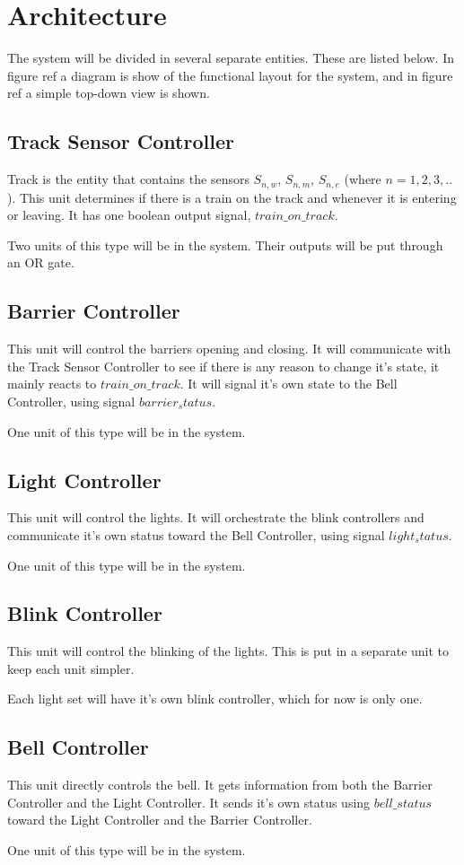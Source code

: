 \documentclass[final]{report}
\begin{document}
\chapter{Architecture}
The system will be divided in several separate entities.
These are listed below.
In figure ref{} a diagram is show of the functional layout for the system, and in figure ref{} a simple top-down view is shown.

\section{Track Sensor Controller}
Track is the entity that contains the sensors $S_{n,w}$, $S_{n,m}$, $S_{n,e}$ (where $n = 1,2,3,..$).
This unit determines if there is a train on the track and whenever it is entering or leaving.
It has one boolean output signal, $train\_on\_track$.

Two units of this type will be in the system.
Their outputs will be put through an OR gate.
\section{Barrier Controller}
This unit will control the barriers opening and closing.
It will communicate with the Track Sensor Controller to see if there is any reason to change it's state, it mainly reacts to $train\_on\_track$.
It will signal it's own state to the Bell Controller, using signal $barrier_status$.

One unit of this type will be in the system.
\section{Light Controller}
This unit will control the lights.
It will orchestrate the blink controllers and communicate it's own status toward the Bell Controller, using signal $light_status$.

One unit of this type will be in the system.
\section{Blink Controller}
This unit will control the blinking of the lights.
This is put in a separate unit to keep each unit simpler.

Each light set will have it's own blink controller, which for now is only one.
\section{Bell Controller}
This unit directly controls the bell.
It gets information from both the Barrier Controller and the Light Controller.
It sends it's own status using $bell\_status$ toward the Light Controller and the Barrier Controller.

One unit of this type will be in the system.
\end{document}
